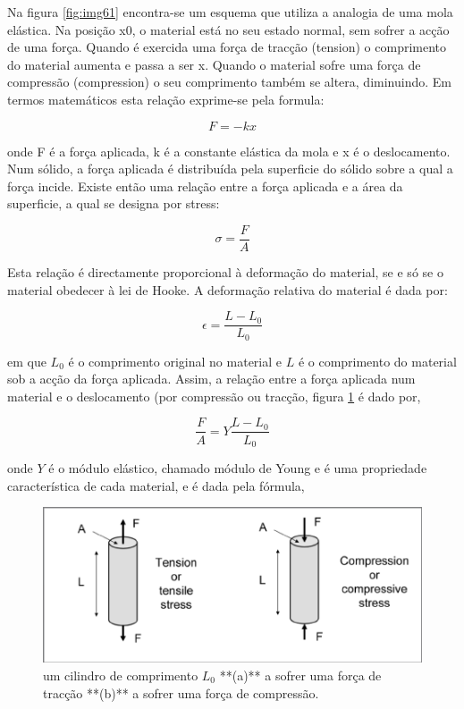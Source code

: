 \documentclass[
  portuguese,
  ]{book}
\begin{document}
Na figura \ref{fig:img61} encontra-se um esquema que utiliza a analogia de uma mola elástica. Na posição x0, o material está no seu estado normal, sem sofrer a acção de uma força. Quando é exercida uma força de tracção (tension) o comprimento do material aumenta e passa a ser x. Quando o material sofre uma força de compressão (compression) o seu comprimento também se altera, diminuindo.
Em termos matemáticos esta relação exprime-se pela formula:

\[ F= -kx\]

onde F é a força aplicada, k é a constante elástica da mola e x é o deslocamento.
Num sólido, a força aplicada é distribuída pela superficie do sólido sobre a qual a força incide. Existe então uma relação entre a força aplicada e a área da superficie, a qual se designa por stress:

\[\sigma=\frac{F}{A}\]

Esta relação é directamente proporcional à deformação do material, se e só se o material obedecer à lei de Hooke.
A deformação relativa do material é dada por:

\[\epsilon=\frac{L-L_0}{L_0}\]

em que \(L_0\) é o comprimento original no material e \(L\) é o comprimento do material sob a acção da força aplicada.
Assim, a relação entre a força aplicada num material e o deslocamento (por compressão ou tracção, figura \ref{fig:img7} é dado por,

\[\frac{F}{A}=Y\frac{L-L_0}{L_0}\]

onde \(Y\) é o módulo elástico, chamado módulo de Young e é uma propriedade característica de cada material, e é dada pela fórmula,

\begin{figure}

{\centering \includegraphics[width=0.5\linewidth]{img/lei_de_hooke_2} 

}

\caption{um cilindro de comprimento $L_0$ **(a)** a sofrer uma força de tracção **(b)** a sofrer uma força de     compressão.}\label{fig:img7}
\end{figure}
\end{document}
